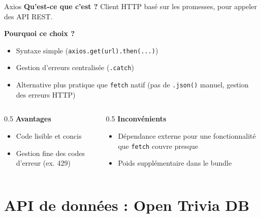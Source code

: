 \documentclass[aspectratio=169]{beamer}
\begin{document}
\begin{frame}{Axios}
  \textbf{Qu'est-ce que c'est ?} Client HTTP basé sur les promesses, pour appeler des API REST.

  \vspace{0.3cm}
  \textbf{Pourquoi ce choix ?}
  \begin{itemize}
    \item Syntaxe simple (\texttt{axios.get(url).then(...)})
    \item Gestion d'erreurs centralisée (\texttt{.catch})
    \item Alternative plus pratique que \texttt{fetch} natif (pas de \texttt{.json()} manuel, gestion des erreurs HTTP)
  \end{itemize}

  \vspace{0.3cm}
  \begin{columns}
    \begin{column}{0.5\textwidth}
      \textbf{Avantages}
      \begin{itemize}
        \item Code lisible et concis
        \item Gestion fine des codes d'erreur (ex. 429)
      \end{itemize}
    \end{column}
    \begin{column}{0.5\textwidth}
      \textbf{Inconvénients}
      \begin{itemize}
        \item Dépendance externe pour une fonctionnalité que \texttt{fetch} couvre presque
        \item Poids supplémentaire dans le bundle
      \end{itemize}
    \end{column}
  \end{columns}
\end{frame}

\section{API de données : Open Trivia DB}
\end{document}
